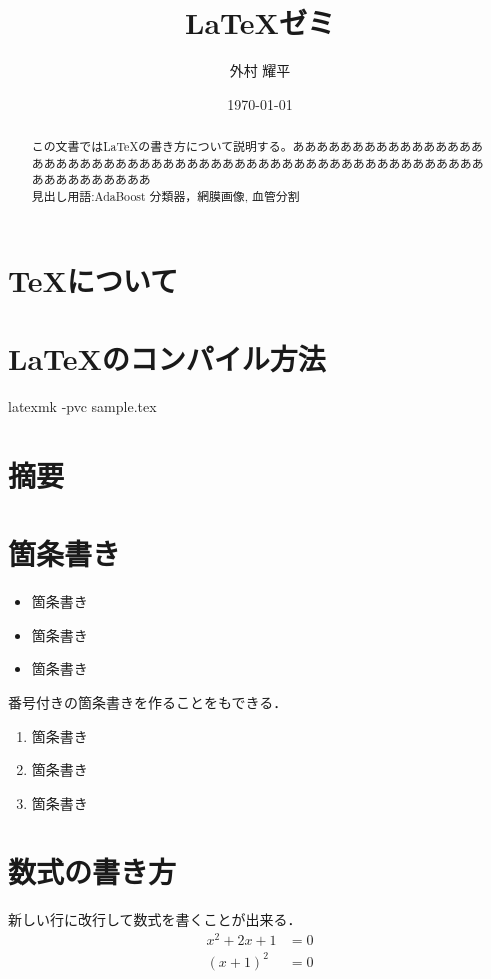 \documentclass[uplatex,11pt,a4j]{jsarticle}
\title{LaTeXゼミ}
\author{外村 耀平}
\date{\today}
\begin{document}
\maketitle

\section{TeXについて}

\section{LaTeXのコンパイル方法}

latexmk -pvc sample.tex


\section{摘要}
\begin{abstract}
この文書ではLaTeXの書き方について説明する。ああああああああああああああああああああああああああああああああああああああああああああああああああああああああああああああああ
\\
\noindent
見出し用語:AdaBoost 分類器，網膜画像, 血管分割
\end{abstract}


\section{箇条書き}

\begin{itemize}
\item 箇条書き
\item 箇条書き
\item 箇条書き
\end{itemize}

番号付きの箇条書きを作ることをもできる．
\begin{enumerate}
\item 箇条書き
\item 箇条書き
\item 箇条書き
\end{enumerate}

\section{数式の書き方}
新しい行に改行して数式を書くことが出来る．
\begin{align}
x^2 + 2x + 1 &= 0 \\
(x + 1)^2 &= 0
\end{align}
\end{document}
